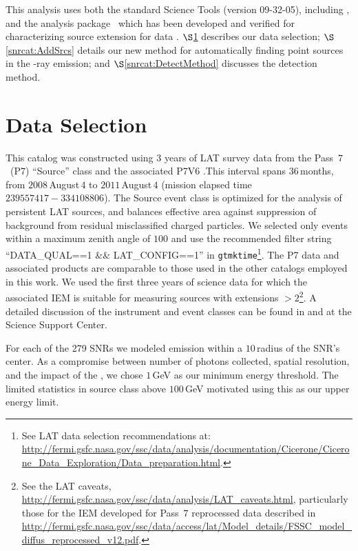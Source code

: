 This analysis uses both the standard Science Tools (version 09-32-05), including \gtlike{}, and the \ptlike{} analysis package~\citep{Kerr10} which has been developed and verified for characterizing source extension for \FermiLat{} data \citep{Lande12}. $\S$\ref{snrcat:Data} describes our data selection; $\S$\ref{snrcat:AddSrcs} details our new method for automatically finding point sources in the \FermiLat{} \g-ray emission; and $\S$\ref{snrcat:DetectMethod} discusses the detection method.

\section{Data Selection}\label{snrcat:Data}
This catalog was constructed using 3 years of LAT survey data from the Pass~$7$~(P7) ``Source'' class and the associated P7V6 \irf{}.This interval spans $36$\,months, from $2008$\,August\,$4$ to $2011$\,August\,$4$ (mission elapsed time $239557417-334108806$). The Source event class is optimized for the analysis of persistent LAT sources, and balances effective area against suppression of background from residual misclassified charged particles. We selected only events within a maximum zenith angle of $100$\degr{} and use the recommended filter string ``DATA\_QUAL==1 \&\& LAT\_CONFIG==1'' in {\tt gtmktime}\footnote{See LAT data selection recommendations at: \url{http://fermi.gsfc.nasa.gov/ssc/data/analysis/documentation/Cicerone/Cicerone_Data_Exploration/Data_preparation.html}.}. 
The P7 data and associated products are comparable to  those used in the other \gam{} catalogs employed in this work. We used the first three years of science data for which the associated IEM is suitable for measuring sources with extensions $>2$\degr \footnote{See the LAT caveats, \url{http://fermi.gsfc.nasa.gov/ssc/data/analysis/LAT_caveats.html}, particularly those for the IEM developed for Pass~$7$ reprocessed data described in \url{http://fermi.gsfc.nasa.gov/ssc/data/access/lat/Model_details/FSSC_model_diffus_reprocessed_v12.pdf}.}. A detailed discussion of the instrument and event classes can be found in \cite{atwood09} and at the \Fermi{} Science Support Center\footnotemark[1].

For each of the 279 SNRs we modeled emission within a $10$\degr{}\,radius of the SNR's center. As a compromise between number of photons collected, spatial resolution, and the impact of the \iem{}, we chose $1$\,GeV as our minimum energy threshold. The limited statistics in source class above $100$\,GeV motivated using this as our upper energy limit. 

